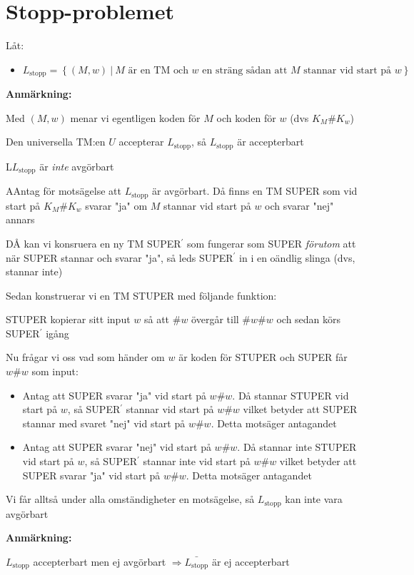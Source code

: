 \section{Stopp-problemet}\par
\noindent Låt:\par
\begin{itemize}
  \item $L_{\text{stopp}} = \left\{(M,w)\:|\:\text{$M$ är en TM och $w$ en sträng sådan att $M$ stannar vid start på $w$}\right\}$
\end{itemize}
\par\bigskip
\noindent\textbf{Anmärkning:}\par
\noindent Med $(M,w)$ menar vi egentligen koden för $M$ och koden för $w$ (dvs $K_M\#K_w$)
\par\bigskip
\noindent Den universella TM:en $U$ accepterar $L_{\text{stopp}}$, så $L_{\text{stopp}}$ är accepterbart
\par\bigskip
\begin{theo}
  L$L_{\text{stopp}}$ är \textit{inte} avgörbart
\end{theo}
\par\bigskip
\begin{prf}
  AAntag för motsägelse att $L_{\text{stopp}}$ är avgörbart. Då finns en TM SUPER som vid start på $K_M\#K_w$ svarar "ja" om $M$ stannar vid start på $w$ och svarar "nej" annars
  \par\bigskip
  \noindent DÅ kan vi konsruera en ny TM SUPER$^{\prime}$ som fungerar som SUPER \textit{förutom} att när SUPER stannar och svarar "ja", så leds SUPER$^{\prime}$ in i en oändlig slinga (dvs, stannar inte)
  \par\bigskip
  \noindent Sedan konstruerar vi en TM STUPER med följande funktion:\par
  STUPER kopierar sitt input $w$ så att $\#w$ övergår till $\#w\#w$ och sedan körs SUPER$^{\prime}$ igång
  \par\bigskip
  \noindent Nu frågar vi oss vad som händer om $w$ är koden för STUPER och SUPER får $w\#w$ som input:\par
  \begin{itemize}
    \item Antag att SUPER svarar "ja" vid start på $w\#w$. Då stannar STUPER vid start på $w$, så SUPER$^{\prime}$ stannar vid start på $w\#w$ vilket betyder att SUPER stannar med svaret "nej" vid start på $w\#w$. Detta motsäger antagandet\par
  \item  Antag att SUPER svarar "nej" vid start på $w\#w$. Då stannar inte STUPER vid start på $w$, så SUPER$^{\prime}$ stannar inte vid start på $w\#w$ vilket betyder att SUPER svarar "ja" vid start på $w\#w$. Detta motsäger antagandet
  \end{itemize}
  \par\bigskip
  \noindent Vi får alltså under alla omständigheter en motsägelse, så $L_{\text{stopp}}$ kan inte vara avgörbart
\end{prf}
\par\bigskip
\noindent\textbf{Anmärkning:}\par
\noindent $L_{\text{stopp}}$ accepterbart men ej avgörbart $\Rightarrow\bar{L_{\text{stopp}}}$ är ej accepterbart
